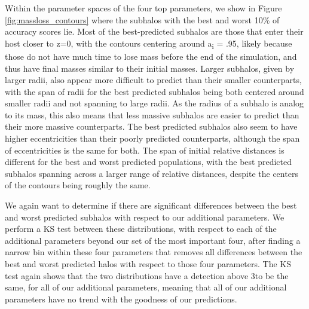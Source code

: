 \documentclass[fleqn,usenatbib]{mnras}
\begin{document}
Within the parameter spaces of the four top parameters, we show in Figure \ref{fig:massloss_contours} where the subhalos with the best and worst 10\% of accuracy scores lie. Most of the best-predicted subhalos are those that enter their host closer to z=0, with the contours centering around a\textsubscript{i} = .95, likely because those do not have much time to lose mass before the end of the simulation, and thus have final masses similar to their initial masses. Larger subhalos, given by larger radii, also appear more difficult to predict than their smaller counterparts, with the span of radii for the best predicted subhalos being both centered around smaller radii and not spanning to large radii. As the radius of a subhalo is analog to its mass, this also means that less massive subhalos are easier to predict than their more massive counterparts. The best predicted subhalos also seem to have higher eccentricities than their poorly predicted counterparts, although the span of eccentricities is the same for both. The span of initial relative distances is different for the best and worst predicted populations, with the best predicted subhalos spanning across a larger range of relative distances, despite the centers of the contours being roughly the same.

We again want to determine if there are significant differences between the best and worst predicted subhalos with respect to our additional parameters. We perform a KS test between these distributions, with respect to each of the additional parameters beyond our set of the most important four, after finding a narrow bin within these four parameters that removes all differences between the best and worst predicted halos with respect to those four parameters. The KS test again shows that the two distributions have a detection above 3\textsigma to be the same, for all of our additional parameters, meaning that all of our additional parameters have no trend with the goodness of our predictions.
\end{document}

